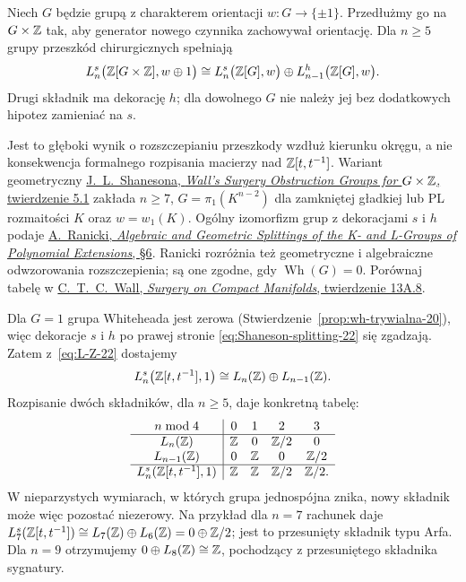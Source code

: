 \begin{twierdzenie}
\label{thm:Shaneson-splitting-22}
Niech $G$ będzie grupą z charakterem orientacji
$w:G\to\{\pm1\}$. Przedłużmy go na
$G\times\mathbb{Z}$ tak, aby generator nowego czynnika
zachowywał orientację. Dla $n\geq5$ grupy przeszkód
chirurgicznych spełniają
\begin{equation}\label{eq:Shaneson-splitting-22}
 L_n^s\bigl(\mathbb{Z}[G\times\mathbb{Z}],w\oplus1\bigr)
 \cong L_n^s\bigl(\mathbb{Z}[G],w\bigr)
       \oplus L_{n-1}^h\bigl(\mathbb{Z}[G],w\bigr).
\end{equation}
Drugi składnik ma dekorację $h$; dla dowolnego
$G$ nie należy jej bez dodatkowych hipotez
zamieniać na $s$.
\end{twierdzenie}

Jest to głęboki wynik o rozszczepianiu przeszkody
wzdłuż kierunku okręgu, a nie konsekwencja
formalnego rozpisania macierzy nad
$\mathbb{Z}[t,t^{-1}]$. Wariant geometryczny
\href{https://webhomes.maths.ed.ac.uk/~v1ranick/papers/shan.pdf}
{J.\ L.\ Shanesona, \emph{Wall's Surgery Obstruction
Groups for $G\times\mathbb{Z}$}, twierdzenie 5.1}
zakłada $n\geq7$, $G=\pi_1(K^{n-2})$ dla
zamkniętej gładkiej lub PL rozmaitości $K$
oraz $w=w_1(K)$. Ogólny izomorfizm grup z dekoracjami
$s$ i $h$ podaje
\href{https://webhomes.maths.ed.ac.uk/~v1ranick/papers/splitkl.pdf}
{A.\ Ranicki, \emph{Algebraic and Geometric Splittings
of the K- and L-Groups of Polynomial Extensions}, §6}.
Ranicki rozróżnia też geometryczne i algebraiczne
odwzorowania rozszczepienia; są one zgodne, gdy
$\operatorname{Wh}(G)=0$. Porównaj tabelę w
\href{https://webhomes.maths.ed.ac.uk/~v1ranick/books/scm.pdf}
{C.\ T.\ C.\ Wall, \emph{Surgery on Compact Manifolds},
twierdzenie 13A.8}.

Dla $G=1$ grupa Whiteheada jest zerowa
(Stwierdzenie~\ref{prop:wh-trywialna-20}),
więc dekoracje $s$ i $h$ po prawej stronie
\eqref{eq:Shaneson-splitting-22} się zgadzają.
Zatem z~\eqref{eq:L-Z-22} dostajemy
\begin{equation}\label{eq:L-ZZ-22}
 L_n^s\bigl(\mathbb{Z}[t,t^{-1}],1\bigr)
 \cong L_n(\mathbb{Z})\oplus L_{n-1}(\mathbb{Z}).
\end{equation}
Rozpisanie dwóch składników, dla $n\geq5$,
daje konkretną tabelę:
\[
\begin{array}{c|cccc}
 n\bmod4&0&1&2&3\\ \hline
 L_n(\mathbb{Z})&\mathbb{Z}&0&\mathbb{Z}/2&0\\
 L_{n-1}(\mathbb{Z})&0&\mathbb{Z}&0&\mathbb{Z}/2\\ \hline
 L_n^s(\mathbb{Z}[t,t^{-1}],1)&\mathbb{Z}&\mathbb{Z}&\mathbb{Z}/2&\mathbb{Z}/2.
\end{array}
\]
W nieparzystych wymiarach, w których grupa
jednospójna znika, nowy składnik może więc
pozostać niezerowy. Na przykład dla $n=7$
rachunek daje
$L_7^s(\mathbb{Z}[t,t^{-1}])\cong
L_7(\mathbb{Z})\oplus L_6(\mathbb{Z})
=0\oplus\mathbb{Z}/2$;
jest to przesunięty składnik typu Arfa.
Dla $n=9$ otrzymujemy
$0\oplus L_8(\mathbb{Z})\cong\mathbb{Z}$,
pochodzący z przesuniętego składnika sygnatury.

